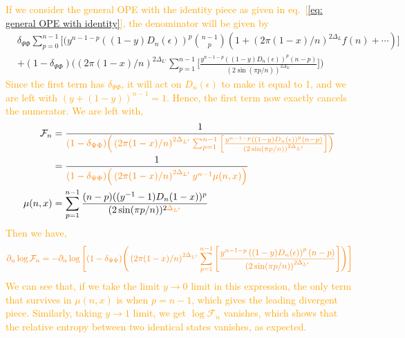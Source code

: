 \documentclass[11pt]{article}
\newcommand{\ep}{\epsilon}
\newcommand{\p}{\partial}
\newcommand{\nn}{\nonumber}
\newcommand{\lb}{\left(}
\newcommand{\rb}{\right)}
\newcommand{\JM}[1]{\textcolor{orange}{#1}}
\begin{document}
\JM{If we consider the general OPE with the identity piece as given in eq.~[\ref{eq: general OPE with identity}], the denominator will be given by}
\begin{align}
    &\delta_{\Psi \Phi} \sum_{p=0}^{n-1}\Big[(y^{n-1-p}\lb (1-y)D_n(\ep) \rb^p\binom{n-1}{p} \lb 1 + \lb 2\pi (1-x)/n\rb ^{2\Delta_{L}} f(n) + \cdots\rb  \Big]\nn \\
    &+ (1- \delta_{\Psi \Phi}) \Big( \lb 2\pi (1-x)/n\rb ^{2\Delta_{L'}} \sum_{p=1}^{n-1}\Big[  \frac{y^{n-1-p}\lb (1-y)D_n(\ep)\rb^p(n-p)}{\lb 2 \sin(\pi p/n)\rb ^{2\Delta_{L'}}}\Big]\Big)
\end{align}
\JM{Since the first term has $\delta_{\Psi \Phi}$, it will act on $D_n(\ep)$ to make it equal to 1, and we are left with $(y + (1-y))^{n-1} =1$. Hence, the first term now exactly cancels the numerator. We are left with,}
\begin{align*}
\mathcal{F}_n
    &=\frac{1}{\JM{(1- \delta_{\Psi \Phi}) \Big( \lb 2\pi (1-x)/n\rb ^{2\Delta_{L'}} \sum_{p=1}^{n-1}\Big[  \frac{y^{n-1-p}\lb (1-y)D_n(\ep)\rb^p(n-p)}{\lb 2 \sin(\pi p/n)\rb ^{2\Delta_{L'}}}\Big]\Big)}}\nn\\ 
    &= \frac{1}{\JM{(1- \delta_{\Psi \Phi}) \Big( \lb 2\pi (1-x)/n\rb ^{2\Delta_{L'}} y^{n-1}\mu(n,x)\Big)}}\nn \\
\mu(n,x)&=\sum_{p=1}^{n-1}\frac{(n-p)((y^{-1}-1)D_n(1-x))^p}{(2\sin(\pi p/n))^{2\JM{\Delta_{L'}}}}
\end{align*}
\JM{Then we have,}
\begin{align}
    \JM{\p_n \log \mathcal{F}_n =-\p_n \log \Bigg[ (1-\delta_{\Psi \Phi})\Bigg( \lb 2\pi (1-x)/n\rb ^{2\Delta_{L'}} \sum_{p=1}^{n-1}\Bigg[  \frac{y^{n-1-p}\lb (1-y)D_n(\ep)\rb^p(n-p)}{\lb 2 \sin(\pi p/n)\rb ^{2\Delta_{L'}}}\Bigg]\Bigg)  \Bigg]}
\end{align}
\JM{We can see that, if we take the limit $y\to 0$ limit in this expression, the only term that survives in $\mu(n,x)$ is when $p = n-1$, which gives the leading divergent piece. 
Similarly, taking $y\to 1$ limit, we get $\log \mathcal{F}_n$ vanishes, which shows that the relative entropy between two identical states vanishes, as expected.}
\end{document}
